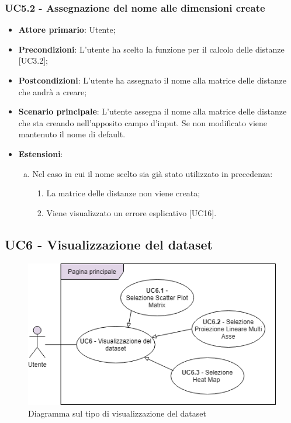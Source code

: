 \subsubsection{UC5.2 - Assegnazione del nome alle dimensioni create}

\begin{itemize}
	\item \textbf{Attore primario}: Utente;
	
	\item \textbf{Precondizioni}: L'utente ha scelto la funzione per il calcolo delle distanze [UC3.2];
	
	\item \textbf{Postcondizioni}: L'utente ha assegnato il nome alla matrice delle distanze che andrà a creare;
	
	\item \textbf{Scenario principale}: L'utente assegna il nome alla matrice delle distanze che sta creando nell'apposito campo d'input. Se non modificato viene mantenuto il nome di default.
\item \textbf{Estensioni}:
	\begin{enumerate}[(a)]
		\item Nel caso in cui il nome scelto sia già stato utilizzato in precedenza:
		\begin{enumerate}[1.]
			\item La matrice delle distanze non viene creata;
			\item Viene visualizzato un errore esplicativo [UC16].
		\end{enumerate}
	\end{enumerate}
\end{itemize}	


\subsection{UC6 - Visualizzazione del dataset}
\begin{figure}[!htb]
\includegraphics[width=14cm]{Section/Images/UC6.png}
\centering
\caption{Diagramma sul tipo di visualizzazione del dataset}
\end{figure}

